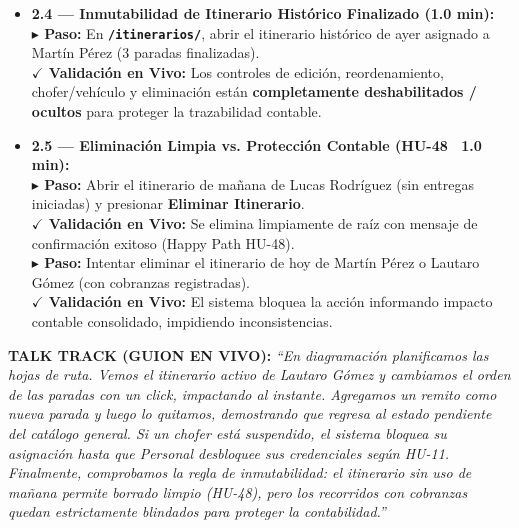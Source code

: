 \documentclass[a4paper,9pt]{article}
\newcommand{\stepact}[1]{\textbf{$\blacktriangleright$ Paso:} #1}
\newcommand{\valact}[1]{\textbf{$\checkmark$ Validación en Vivo:} #1}
\newcommand{\codeb}[1]{\texttt{\bfseries #1}}
\begin{document}
\begin{tcolorbox}[cardframe, top=3pt, bottom=3pt, left=6pt, right=6pt]
{\begin{itemize}[leftmargin=11pt, itemsep=4pt]
\item \textbf{2.4 — Inmutabilidad de Itinerario Histórico Finalizado (1.0 min):} \\
\stepact{En \codeb{/itinerarios/}, abrir el itinerario histórico de ayer asignado a Martín Pérez (3 paradas finalizadas).} \\
\valact{Los controles de edición, reordenamiento, chofer/vehículo y eliminación están \textbf{completamente deshabilitados / ocultos} para proteger la trazabilidad contable.}

\item \textbf{2.5 — Eliminación Limpia vs. Protección Contable (HU-48 \textbar\ 1.0 min):} \\
\stepact{Abrir el itinerario de mañana de Lucas Rodríguez (sin entregas iniciadas) y presionar \textbf{Eliminar Itinerario}.} \\
\valact{Se elimina limpiamente de raíz con mensaje de confirmación exitoso (Happy Path HU-48).} \\
\stepact{Intentar eliminar el itinerario de hoy de Martín Pérez o Lautaro Gómez (con cobranzas registradas).} \\
\valact{El sistema bloquea la acción informando impacto contable consolidado, impidiendo inconsistencias.}

\end{itemize}
}

\vspace{1pt}
\begin{tcolorbox}[talktrackcard]
{\scriptsize\textbf{TALK TRACK (GUION EN VIVO):}} {\scriptsize\itshape
``En diagramación planificamos las hojas de ruta. Vemos el itinerario activo de Lautaro Gómez y cambiamos el orden de las paradas con un click, impactando al instante. Agregamos un remito como nueva parada y luego lo quitamos, demostrando que regresa al estado pendiente del catálogo general. Si un chofer está suspendido, el sistema bloquea su asignación hasta que Personal desbloquee sus credenciales según HU-11. Finalmente, comprobamos la regla de inmutabilidad: el itinerario sin uso de mañana permite borrado limpio (HU-48), pero los recorridos con cobranzas quedan estrictamente blindados para proteger la contabilidad.''}
\end{tcolorbox}
\end{tcolorbox}

\vspace{-4pt}
\end{document}
